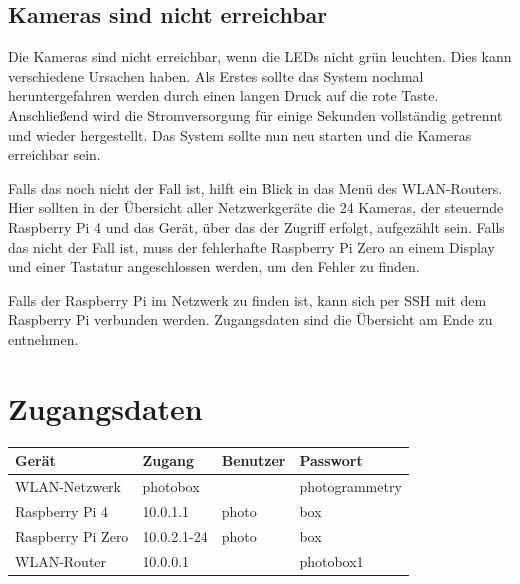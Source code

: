 \documentclass[./00PhotoBox.tex]{subfiles}
\begin{document}
\subsection{Kameras sind nicht erreichbar}
Die Kameras sind nicht erreichbar, wenn die LEDs nicht grün leuchten. Dies kann verschiedene Ursachen haben. Als Erstes sollte das System nochmal heruntergefahren werden durch einen langen Druck auf die rote Taste. Anschließend wird die Stromversorgung für einige Sekunden vollständig getrennt und wieder hergestellt. Das System sollte nun neu starten und die Kameras erreichbar sein.

Falls das noch nicht der Fall ist, hilft ein Blick in das Menü des WLAN-Routers. Hier sollten in der Übersicht aller Netzwerkgeräte die 24 Kameras, der steuernde Raspberry Pi 4 und das Gerät, über das der Zugriff erfolgt, aufgezählt sein. Falls das nicht der Fall ist, muss der fehlerhafte Raspberry Pi Zero an einem Display und einer Tastatur angeschlossen werden, um den Fehler zu finden.

Falls der Raspberry Pi im Netzwerk zu finden ist, kann sich per SSH mit dem Raspberry Pi verbunden werden. Zugangsdaten sind die Übersicht am Ende zu entnehmen.

\section{Zugangsdaten}

\begin{tabular}{|l|l|l|l|}
    \hline
    \textbf{Gerät}    & \textbf{Zugang} & \textbf{Benutzer} & \textbf{Passwort} \\
    \hline
    WLAN-Netzwerk     & photobox        &                   & photogrammetry    \\
    \hline
    Raspberry Pi 4    & 10.0.1.1        & photo             & box               \\
    \hline
    Raspberry Pi Zero & 10.0.2.1-24     & photo             & box               \\
    \hline
    WLAN-Router       & 10.0.0.1        &                   & photobox1         \\
    \hline
\end{tabular}

\end{document}
